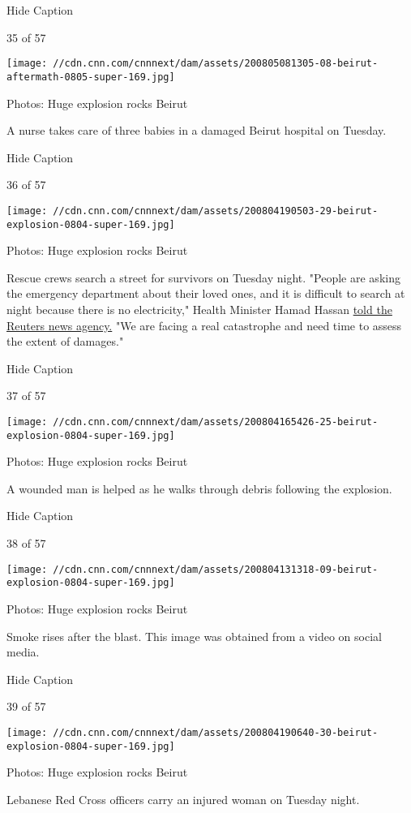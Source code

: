 Hide Caption

35 of 57

\texttt{[image: //cdn.cnn.com/cnnnext/dam/assets/200805081305-08-beirut-aftermath-0805-super-169.jpg]}

Photos: Huge explosion rocks Beirut

A nurse takes care of three babies in a damaged Beirut hospital on
Tuesday.

Hide Caption

36 of 57

\texttt{[image: //cdn.cnn.com/cnnnext/dam/assets/200804190503-29-beirut-explosion-0804-super-169.jpg]}

Photos: Huge explosion rocks Beirut

Rescue crews search a street for survivors on Tuesday night. "People are
asking the emergency department about their loved ones, and it is
difficult to search at night because there is no electricity," Health
Minister Hamad Hassan
\href{https://www.cnn.com/middleeast/live-news/lebanon-beirut-explosion-live-updates-dle-intl/h_191ad60f239ae9b49e4332022ce8db8c}{told
the Reuters news agency.} "We are facing a real catastrophe and need
time to assess the extent of damages."

Hide Caption

37 of 57

\texttt{[image: //cdn.cnn.com/cnnnext/dam/assets/200804165426-25-beirut-explosion-0804-super-169.jpg]}

Photos: Huge explosion rocks Beirut

A wounded man is helped as he walks through debris following the
explosion.

Hide Caption

38 of 57

\texttt{[image: //cdn.cnn.com/cnnnext/dam/assets/200804131318-09-beirut-explosion-0804-super-169.jpg]}

Photos: Huge explosion rocks Beirut

Smoke rises after the blast. This image was obtained from a video on
social media.

Hide Caption

39 of 57

\texttt{[image: //cdn.cnn.com/cnnnext/dam/assets/200804190640-30-beirut-explosion-0804-super-169.jpg]}

Photos: Huge explosion rocks Beirut

Lebanese Red Cross officers carry an injured woman on Tuesday night.

